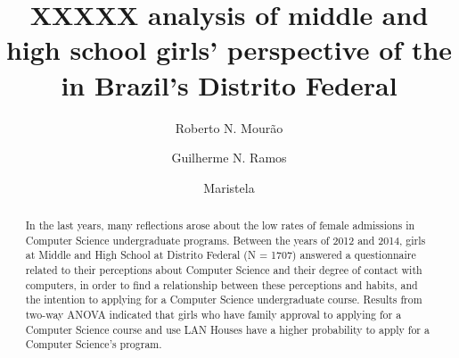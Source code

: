 \documentclass{llncs}
\begin{document}
%
\title{XXXXX analysis of middle and high school girls' perspective of the in Brazil's Distrito Federal}%
%
\author{Roberto N. Mourão%
\and Guilherme N. Ramos%
\and Maristela}%
%
%

\maketitle%

\begin{abstract}%
In the last years, many reflections arose about the low rates of female admissions in Computer Science undergraduate programs. Between the years of 2012 and 2014, girls at Middle and High School at Distrito Federal (N = 1707) answered a questionnaire related to their perceptions about Computer Science and their degree of contact with computers, in order to find a relationship between these perceptions and habits, and the intention to applying for a Computer Science undergraduate course. Results from two-way ANOVA indicated that girls who have family approval to applying for a Computer Science course and use LAN Houses have a higher probability to apply for a Computer Science's program.

%
\end{abstract}%

%
%
%
%
%

%
%
\end{document}
